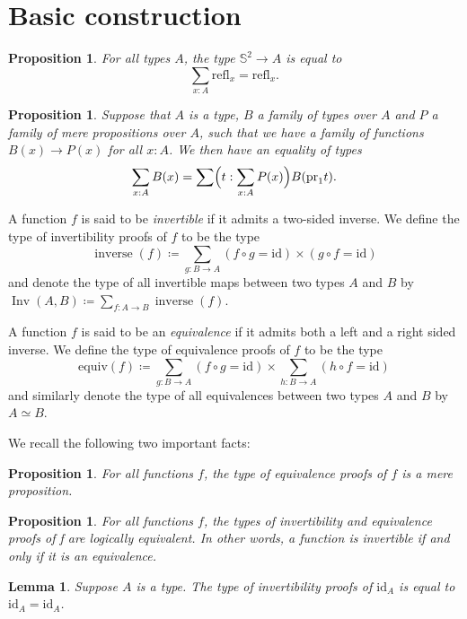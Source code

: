 \documentclass{article}
\theoremstyle{plain}
\newtheorem{proposition}[theorem]{Proposition}
\newtheorem{lemma}[theorem]{Lemma}
\theoremstyle{definition}
\theoremstyle{remark}
\newcommand{\id}{\mathrm{id}}
\newcommand{\isequiv}{\mathrm{equiv}}
\newcommand{\pr}{\mathrm{pr}}
\newcommand{\refl}{\mathrm{refl}}
\newcommand{\nsphere}[1]{\mathbb{S}^{#1}}
\newcommand{\sphere}{\nsphere{2}}
\DeclareMathOperator{\inv}{Inv}
\DeclareMathOperator{\inverse}{inverse}
\begin{document}
\section{Basic construction}

\begin{proposition}
  \label{universal-property-sphere}
  For all types \(A\), the type \(\sphere \to A\) is equal to
  \[\sum_{x : A} \refl_{x} = \refl_{x}.\]
\end{proposition}
\begin{proposition}
  \label{family-over-subtype}
  Suppose that \(A\) is a type, \(B\) a family of types over \(A\) and \(P\) a family of mere
  propositions over \(A\), such that we have a family of functions \(B(x) \to P(x)\) for all
  \(x : A\). We then have an equality of types
  \[\sum_{x : A}B(x) = \sum \Bigl(t : \sum_{x : A}P(x)\Bigr) B(\pr_{1}t).\]
\end{proposition}

A function \(f\) is said to be \emph{invertible}
if it admits a two-sided inverse.
We define the type of invertibility proofs of \(f\) to be the type
\[\inverse(f) \coloneq \sum_{g : B \to A}(f \circ g = \id) \times (g \circ f = \id)\]
and denote the type of all invertible maps between two types \(A\) and \(B\) by
\(\inv(A, B) \coloneq \sum_{f : A \to B}\inverse(f)\).

A function \(f\) is said to be an \emph{equivalence} if it admits both a left and a
right sided inverse.
We define the type of equivalence proofs of \(f\) to be the type
\[\isequiv(f) \coloneq \sum_{g : B \to A}(f \circ g = \id) \times
  \sum_{h : B \to A}(h \circ f = \id)\]
and similarly denote the type of all equivalences between two types \(A\) and \(B\)
by~\(A \simeq B\).


We recall the following two important facts:
\begin{proposition}
  \label{is-prop-equiv}
  For all functions \(f\), the type of equivalence proofs of \(f\) is a mere proposition.
\end{proposition}

\begin{proposition}
  \label{inv-implies-equiv}
  For all functions \(f\), the types of invertibility and equivalence proofs of f are
  logically equivalent. In other words, a function is invertible if and only if it is
  an equivalence.
\end{proposition}

\begin{lemma}
  \label{inv-id}
  Suppose \(A\) is a type. The type of invertibility proofs of \(\id_{A}\) is equal
  to \(\id_{A} = \id_{A}\).
\end{lemma}
\end{document}
